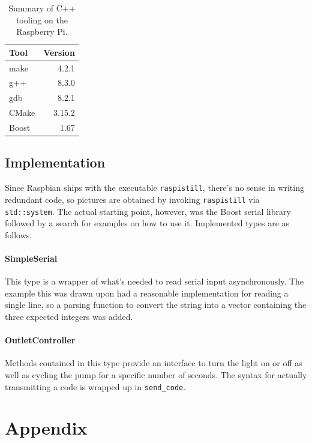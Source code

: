 \documentclass[]{article}
\begin{document}
\begin{table}[h]
	\centering
	\caption{Summary of C++ tooling on the Raspberry Pi.}
	\begin{tabular}{l|r}
		\textbf{Tool} & \textbf{Version} \\ \hline
		make & 4.2.1 \\ \hline
		g++ & 8.3.0 \\ \hline
		gdb & 8.2.1 \\ \hline		
		CMake & 3.15.2 \\ \hline
		Boost & 1.67
	\end{tabular}	
\end{table}

\subsection{Implementation}
Since Raspbian ships with the executable \verb|raspistill|, there's no sense in writing redundant code, so pictures are obtained by invoking \verb|raspistill| via \verb|std::system|.  The actual starting point, however, was the Boost serial library followed by a search for examples on how to use it.  Implemented types are as follows.

\paragraph{SimpleSerial}
This type is a wrapper of what's needed to read serial input asynchronously.  The example this was drawn upon had a reasonable implementation for reading a single line, so a parsing function to convert the string into a vector containing the three expected integers was added.

\paragraph{OutletController}
Methods contained in this type provide an interface to turn the light on or off as well as cycling the pump for a specific number of seconds.  The syntax for actually transmitting a code is wrapped up in \verb|send_code|.



\newpage
\section{Appendix}
\end{document}
